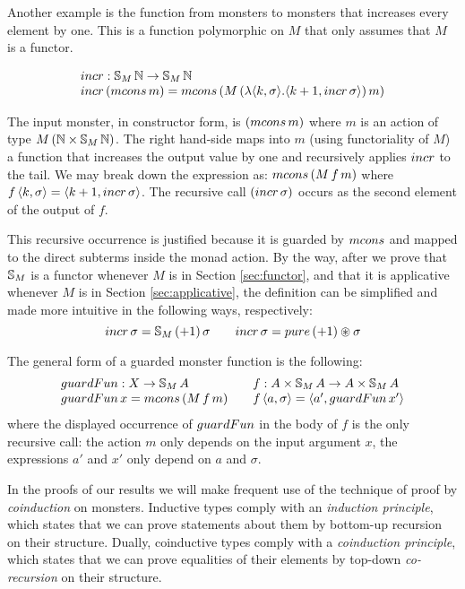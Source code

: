 Another example is the function from monsters to monsters that increases every element by one.
This is a function polymorphic on $M$ that only assumes that $M$ is a functor.

$$
\begin{array}{l}
\incr : \stream{M}\,\nat \rightarrow \stream{M}\,\nat\\
\incr\,(\mcons\,m) = \mcons\,(M\,(\lambda \pair{k}{\sigma}. \pair{k+1}{\incr\,\sigma})\,m)
\end{array}
$$

The input monster, in constructor form, is $(\mcons\,m)$ where $m$ is an action of type $M\,(\mathbb{N}\times \mathbb{S}_{M}\,\mathbb{N})$.
The right hand-side maps into $m$ (using functoriality of $M$) a function that increases the output value by one and recursively applies $\incr$ to the tail.
We may break down the expression as: $\mcons\,(M\,f\,m)$ where $f\,\pair{k}{\sigma} = \pair{k+1}{\incr\,\sigma}$.
The recursive call $(\incr\,\sigma)$ occurs as the second element of the output of $f$.

This recursive occurrence is justified because it is guarded by $\mcons$ and mapped to the direct subterms inside the monad action.
By the way,
after we prove that $\mathbb{S}_{M}$ is a functor whenever $M$ is in Section \ref{sec:functor}, and that it is applicative whenever $M$ is in Section \ref{sec:applicative},
the definition can be simplified and made more intuitive in the following ways, respectively:
$$
\incr\,\sigma = \stream{M}\,(+1)\,\sigma
\qquad
\incr\,\sigma = \apure\,(+1) \appl \sigma
$$

The general form of a guarded monster function is the following:
$$
\begin{array}{l@{\qquad}l}
\guardf : X \rightarrow \stream{M}\,A
& f : A\times \stream{M}\,A \rightarrow A\times \stream{M}\,A \\
\guardf\,x = \mcons\,(M\,f\,m)
& f\,\langle a, \sigma \rangle = \langle a', \guardf\,x' \rangle
\end{array}
$$
where the displayed occurrence of $\guardf$ in the body of $f$ is the only recursive call: the action $m$ only depends on the input argument $x$, the expressions $a'$ and $x'$ only depend on $a$ and $\sigma$.

In the proofs of our results we will make frequent use of the technique of proof by {\em coinduction} on monsters.
Inductive types comply with an {\em induction principle}, which states that we can prove statements about them by bottom-up recursion on their structure.
Dually, coinductive types comply with a {\em coinduction principle}, which states that we can prove equalities of their elements by top-down {\em co-recursion} on their structure.

